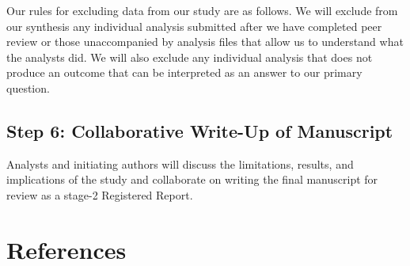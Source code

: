 \documentclass[
  12pt,
]{article}
\begin{document}
Our rules for excluding data from our study are as follows.
We will exclude from our synthesis any individual analysis submitted after we have completed peer review or those unaccompanied by analysis files that allow us to understand what the analysts did.
We will also exclude any individual analysis that does not produce an outcome that can be interpreted as an answer to our primary question.

\hypertarget{step-6-collaborative-write-up-of-manuscript}{%
\subsection{Step 6: Collaborative Write-Up of Manuscript}\label{step-6-collaborative-write-up-of-manuscript}}

Analysts and initiating authors will discuss the limitations, results, and implications of the study and collaborate on writing the final manuscript for review as a stage-2 Registered Report.

\newpage

\hypertarget{references}{%
\section{References}\label{references}}

\begingroup
\setlength{\parindent}{-0.5in}
\setlength{\leftskip}{0.5in}
\end{document}

